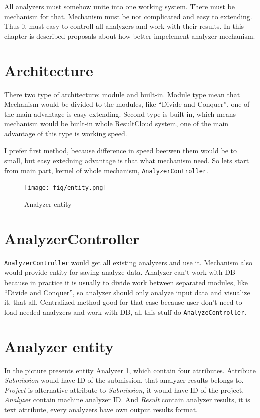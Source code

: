 All analyzers must somehow unite into one working system. There must be mechanism for that. Mechanism must be not complicated and easy to extending. Thus it must easy to controll all analyzers and work with their results. In this chapter is described proposals about how better impelement analyzer mechanism.

\section{Architecture} 

There two type of architecture: module and built-in. Module type mean that Mechanism would be divided to the modules, like “Divide and Conquer”, one of the main advantage is easy extending. Second type is built-in, which means mechanism would be built-in whole ResultCloud system, one of the main advantage of this type is working speed.

I prefer first method, because difference in speed beetwen them would be to small, but easy extedning advantage is that what mechanism need. So lets start from main part, kernel of whole mechanism, \texttt{AnalyzerController}. 

\begin{figure}
  \centering
    \texttt{[image: fig/entity.png]}
  \caption{Analyzer entity}
  \label{fig:entity}
\end{figure}

\section{AnalyzerController}

\texttt{AnalyzerController} would get all existing analyzers and use it. Mechanism also would provide entity for saving analyze data. Analyzer can't work with DB because in practice it is usually to divide work between separated modules, like “Divide and Conquer”, so analyzer should only analyze input data and visualize it, that all. Centralized method good for that case because user don't need to load needed analyzers and work with DB, all this stuff do \texttt{AnalyzeController}.

\section{Analyzer entity}

In the picture presents entity Analyzer \ref{fig:entity}, which contain four attributes. Attribute \emph{Submission} would have ID of the submission, that analyzer results belongs to. \emph{Project} is alternative attribute to \emph{Submission}, it would have ID of the project. \emph{Analyzer} contain machine analyzer ID. And \emph{Result} contain analyzer results, it is text attribute, every analyzers have own output results format.

